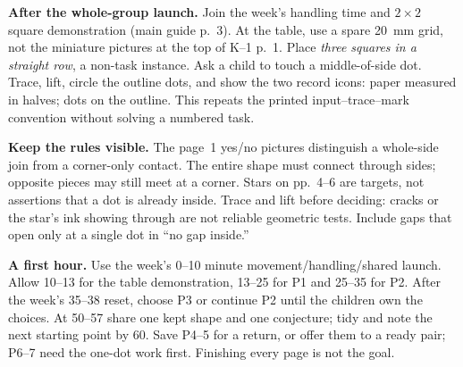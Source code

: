 \documentclass[11pt]{article}
\newcommand{\dotgrid}[2]{\foreach \x in {0,...,#1}{\foreach \y in {0,...,#2}{\fill (\x,\y) circle (1.25pt);}}}
\begin{document}
\textbf{After the whole-group launch.} Join the week's handling time and $2\times2$ square demonstration (main guide p.~3). At the table, use a spare 20~mm grid, not the miniature pictures at the top of K--1 p.~1. Place \emph{three squares in a straight row}, a non-task instance. Ask a child to touch a middle-of-side dot. Trace, lift, circle the outline dots, and show the two record icons: paper measured in halves; dots on the outline. This repeats the printed input--trace--mark convention without solving a numbered task.
\begin{center}
\end{center}
\textbf{Keep the rules visible.} The page~1 yes/no pictures distinguish a whole-side join from a corner-only contact. The entire shape must connect through sides; opposite pieces may still meet at a corner. Stars on pp.~4--6 are targets, not assertions that a dot is already inside. Trace and lift before deciding: cracks or the star's ink showing through are not reliable geometric tests. Include gaps that open only at a single dot in ``no gap inside.''

\textbf{A first hour.} Use the week's 0--10 minute movement/handling/shared launch. Allow 10--13 for the table demonstration, 13--25 for P1 and 25--35 for P2. After the week's 35--38 reset, choose P3 or continue P2 until the children own the choices. At 50--57 share one kept shape and one conjecture; tidy and note the next starting point by 60. Save P4--5 for a return, or offer them to a ready pair; P6--7 need the one-dot work first. Finishing every page is not the goal.
\end{document}
